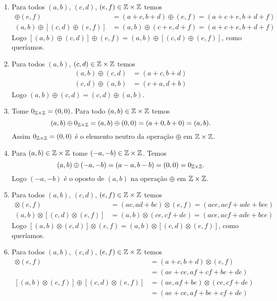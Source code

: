 \documentclass[12pt]{article}
\begin{document}
	\begin{enumerate}[label={\roman*})]
		\item Para todos $(a, b)$, $(c, d)$, $(e, f) \in \mathbb{Z} \times \mathbb{Z}$ temos
		\begin{align*}
			[(a, b) \oplus (c, d)] \oplus (e, f) &= (a + c, b + d) \oplus (e, f) = (a + c + e, b + d + f)\\
			(a, b) \oplus [(c, d) \oplus (e, f)] &= (a, b) \oplus (c + e, d + f) = (a + c + e, b + d + f)
		\end{align*}
		Logo $[(a, b) \oplus (c, d)] \oplus (e, f) = (a, b) \oplus [(c, d) \oplus (e, f)]$, como queríamos.

		\item Para todos $(a, b)$, $(c, d) \in \mathbb{Z} \times \mathbb{Z}$ temos
		\begin{align*}
			(a, b) \oplus (c, d) &= (a + c, b + d)\\
			(c, d) \oplus (a, b) &= (c + a, d + b)
		\end{align*}
		Logo $(a, b) \oplus (c, d) = (c, d) \oplus (a, b)$.

		\item Tome $0_{\mathbb{Z} \times \mathbb{Z}} = (0, 0)$. Para todo $(a, b) \in \mathbb{Z} \times \mathbb{Z}$ temos
		\[
			(a, b) \oplus 0_{\mathbb{Z} \times \mathbb{Z}} = (a, b) \oplus (0, 0) = (a + 0, b + 0) = (a, b).
		\]
		Assim $0_{\mathbb{Z} \times \mathbb{Z}} = (0, 0)$ é o elemento neutro da operação $\oplus$ em $\mathbb{Z} \times \mathbb{Z}$.

		\item Para $(a, b) \in \mathbb{Z} \times \mathbb{Z}$ tome $(-a, -b) \in \mathbb{Z} \times \mathbb{Z}$. Temos
		\[
			(a, b) \oplus (-a, -b) = (a - a, b - b) = (0, 0) = 0_{\mathbb{Z} \times \mathbb{Z}}.
		\]
		Logo $(-a, -b)$ é o oposto de $(a, b)$ na operação $\oplus$ em $\mathbb{Z} \times \mathbb{Z}$.

		\item Para todos $(a, b)$, $(c, d)$, $(e, f) \in \mathbb{Z} \times \mathbb{Z}$ temos
		\begin{align*}
			[(a, b) \otimes (c, d)] \otimes (e, f) &= (ac, ad + bc) \otimes (e, f) = (ace, acf + ade + bce)\\
			(a, b) \otimes [(c, d) \otimes (e, f)] &= (a, b) \otimes (ce, cf + de) = (ace, acf + ade + bce)
		\end{align*}
		Logo $[(a, b) \otimes (c, d)] \otimes (e, f) = (a, b) \otimes [(c, d) \otimes (e, f)]$, como queríamos.

		\item Para todos $(a, b)$, $(c, d)$, $(e, f) \in \mathbb{Z} \times \mathbb{Z}$ temos
		\begin{align*}
			[(a, b) \oplus (c, d)] \otimes (e, f) &= (a + c, b + d) \otimes (e, f) \\& = (ae + ce, af + cf + be + de)\\
			[(a, b) \otimes (e, f)] \oplus [(c, d) \otimes (e, f)] &= (ae, af + be) \otimes (ce, cf + de) \\ &= (ae + ce, af + be + cf + de)
		\end{align*}


\end{enumerate}
\end{document}
